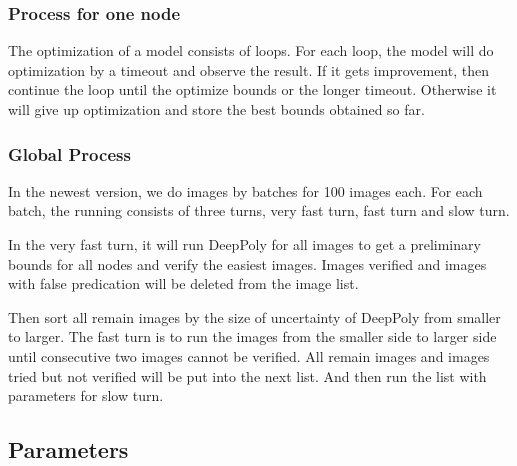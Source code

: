 \documentclass{llncs}
\begin{document}
%
%


\subsubsection*{Process for one node}

 The optimization of a model consists of loops. For each loop, the model will do optimization by a timeout and observe the result. If it gets improvement, then continue the loop until the optimize bounds or the longer timeout. Otherwise it will give up optimization and store the best bounds obtained so far.  



\subsubsection*{Global Process}

In the newest version, we do images by batches for 100 images each. For each batch, the running consists of three turns, very fast turn, fast turn and slow turn.

In the very fast turn, it will run DeepPoly for all images to get a preliminary bounds for all nodes and verify the easiest images. Images verified and images with false predication will be deleted from the image list.

Then sort all remain images by the size of uncertainty of DeepPoly from smaller to larger. The fast turn is to run the images from the smaller side to larger side until consecutive two images cannot be verified. All remain images and images tried but not verified will be put into the next list. And then run the list with parameters for slow turn.




\subsection{Parameters}
\end{document}
